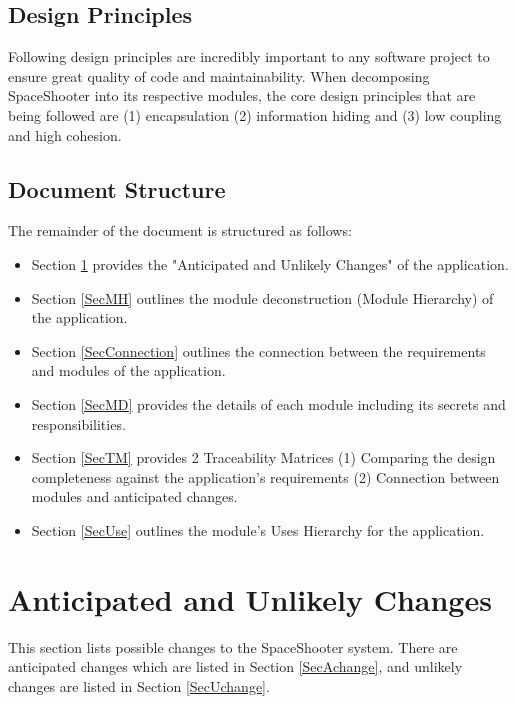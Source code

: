 \documentclass[12pt, titlepage]{article}
\begin{document}
\subsection{Design Principles}
Following design principles are incredibly important to any software project to ensure great quality of code and maintainability. When decomposing SpaceShooter into its respective modules, the core design principles that are being followed are (1) encapsulation (2) information hiding and (3) low coupling and high cohesion. 

	
\subsection{Document Structure}
The remainder of the document is structured as follows:
\begin{itemize}

\item Section \ref{SecChange} provides the "Anticipated and Unlikely Changes" of the application.

\item Section \ref{SecMH} outlines the module deconstruction (Module Hierarchy) of the application.

\item Section \ref{SecConnection} outlines the connection between the requirements and modules of the application.

\item Section \ref{SecMD} provides the details of each module including its secrets and responsibilities. 

\item Section \ref{SecTM} provides 2 Traceability Matrices (1) Comparing the design completeness against the application's requirements (2) Connection between modules and anticipated changes.

\item Section \ref{SecUse} outlines the module's Uses Hierarchy for the application.
\end{itemize}	

\section{Anticipated and Unlikely Changes} \label{SecChange}

This section lists possible changes to the SpaceShooter system. There are anticipated changes which are listed in Section \ref{SecAchange}, and
unlikely changes are listed in Section \ref{SecUchange}.
\end{document}
